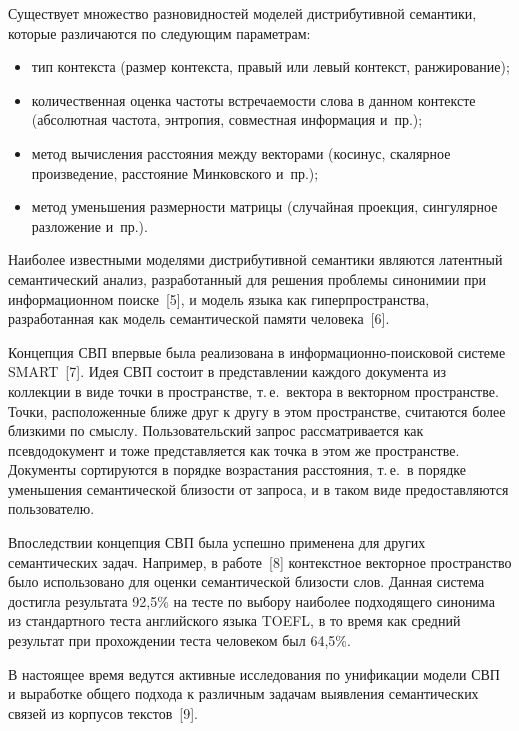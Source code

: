 \begin{multicols}{2}
Существует множество разновидностей моделей дистрибутивной 
семантики, которые различаются по следующим параметрам:
\begin{itemize}
\item тип контекста (размер контекста, правый или левый контекст, 
ранжирование);
\item количественная оценка частоты встречаемости слова в данном 
контексте (абсолютная частота, энтропия, совместная информация и~пр.); 
\item метод вычисления расстояния между векторами (косинус, скалярное 
произведение, расстояние Минковского и~пр.);
\item метод уменьшения размерности матрицы (случайная проекция, 
сингулярное разложение и~пр.).
\end{itemize}

Наиболее известными моделями дистрибутивной семантики являются 
латентный семантический анализ, разработанный для решения проблемы 
синонимии при информационном поиске~[5], и модель языка как 
гиперпространства, разработанная как модель семантической памяти 
человека~[6].

Концепция СВП впервые была 
реализована в ин\-фор\-ма\-ци\-он\-но-поиско\-вой системе SMART~[7].\linebreak 
Идея СВП состоит в представлении каждого документа из коллекции в 
виде точки в пространстве, т.\,е.\ вектора в векторном пространстве. Точки,\linebreak 
расположенные ближе друг к другу в этом пространстве, считаются более 
близкими по смыслу. Пользовательский запрос рассматривается как 
псевдодокумент и тоже представляется как точка в этом же пространстве. 
Документы сортируются в порядке возрастания расстояния, т.\,е.\ в 
порядке уменьшения семантической близости от запроса, и в таком виде 
предоставляются пользователю. 

Впоследствии концепция СВП была успешно применена для других 
семантических задач. Например, в работе~[8] контекстное векторное 
пространство было использовано для оценки семантической близости 
слов. Данная сис\-те\-ма достигла результата 92,5\% на тесте по выбору 
наиболее подходящего синонима из стандартного теста английского языка 
TOEFL, в то время как средний результат при прохождении теста 
человеком был 64,5\%.

В настоящее время ведутся активные исследования по унификации модели 
СВП и выработке общего подхода к различным задачам выявления 
семантических связей из корпусов текстов~[9].


\end{multicols}
